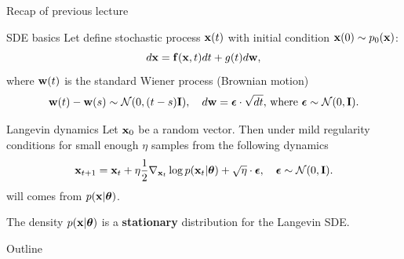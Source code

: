 

\usepackage{tikz}

\usetikzlibrary{arrows,shapes,positioning,shadows,trees}

\begin{frame}
\titlepage
\end{frame}
\begin{frame}{Recap of previous lecture}
	\vspace{-0.2cm}
	\begin{block}{SDE basics}
		Let define stochastic process $\mathbf{x}(t)$ with initial condition $\mathbf{x}(0) \sim p_0(\mathbf{x})$:
		\[
			d\mathbf{x} = \mathbf{f}(\mathbf{x}, t) dt + g(t) d \mathbf{w}, 
		\]
		where $\mathbf{w}(t)$ is the standard Wiener process (Brownian motion)
		\vspace{-0.2cm}
		\[		
			\mathbf{w}(t) - \mathbf{w}(s) \sim \mathcal{N}(0, (t - s) \mathbf{I}), \quad d \mathbf{w} = \boldsymbol{\epsilon} \cdot \sqrt{dt}, \, \text{where } \boldsymbol{\epsilon} \sim \mathcal{N}(0, \mathbf{I}).
		\]
	\end{block}
	\vspace{-0.5cm}
	\begin{block}{Langevin dynamics}
		Let $\mathbf{x}_0$ be a random vector. Then under mild regularity conditions for small enough $\eta$ samples from the following dynamics
		\vspace{-0.2cm}
		\[
			\mathbf{x}_{t + 1} = \mathbf{x}_t + \eta \frac{1}{2} \nabla_{\mathbf{x}_t} \log p(\mathbf{x}_t | \boldsymbol{\theta}) + \sqrt{\eta} \cdot \boldsymbol{\epsilon}, \quad \boldsymbol{\epsilon} \sim \mathcal{N}(0, \mathbf{I}).
		\]
		will comes from $p(\mathbf{x} | \boldsymbol{\theta})$.
	\end{block}
	The density $p(\mathbf{x} | \boldsymbol{\theta})$ is a \textbf{stationary} distribution for the Langevin SDE.
\end{frame}
\begin{frame}{Outline}
	\tableofcontents
\end{frame}
